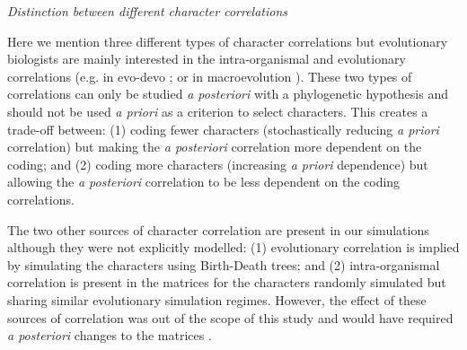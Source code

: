 \documentclass[12pt,letterpaper]{article}
\renewcommand{\subsection}[1]{%
\bigskip
\begin{center}
\begin{large}
\normalfont\itshape #1
\end{large}
\end{center}}
\begin{document}
\subsection{Distinction between different character correlations}
Here we mention three different types of character correlations but evolutionary biologists are mainly interested in the intra-organismal and evolutionary correlations (e.g. in evo-devo \citealt{goswami2006morphological}; or in macroevolution \citealt{fitzjohn2014much}).
These two types of correlations can only be studied \textit{a posteriori} with a phylogenetic hypothesis and should not be used \textit{a priori} as a criterion to select characters.
This creates a trade-off between: (1) coding fewer characters (stochastically reducing \textit{a priori} correlation) but making the \textit{a posteriori} correlation more dependent on the coding;
and (2) coding more characters (increasing \textit{a priori} dependence) but allowing the \textit{a posteriori} correlation to be less dependent on the coding correlations.

The two other sources 
 of character correlation are present in our simulations although they were not explicitly modelled:
(1) evolutionary correlation is implied by simulating the characters using Birth-Death trees;
and (2) intra-organismal correlation is present in the matrices for the characters randomly simulated but sharing similar evolutionary simulation regimes.%
However, the effect of these sources of correlation was out of the scope of this study and would have required \textit{a posteriori} changes to the matrices \citep{Lande1983,Maddison1990,Pagel1994}.
\end{document}
